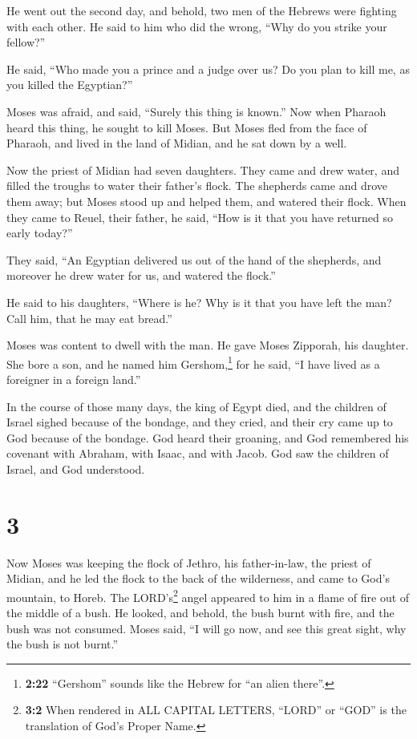  He went out the second day, and behold, two men of the
Hebrews were fighting with each other. He said to him who did the wrong,
``Why do you strike your fellow?''

 He said, ``Who made you a prince and a judge over us? Do
you plan to kill me, as you killed the Egyptian?''

Moses was afraid, and said, ``Surely this thing is known.''
 Now when Pharaoh heard this thing, he sought to kill
Moses. But Moses fled from the face of Pharaoh, and lived in the land of
Midian, and he sat down by a well.

 Now the priest of Midian had seven daughters. They came
and drew water, and filled the troughs to water their father's flock.
 The shepherds came and drove them away; but Moses stood
up and helped them, and watered their flock.  When they
came to Reuel, their father, he said, ``How is it that you have returned
so early today?''

 They said, ``An Egyptian delivered us out of the hand of
the shepherds, and moreover he drew water for us, and watered the
flock.''

 He said to his daughters, ``Where is he? Why is it that
you have left the man? Call him, that he may eat bread.''

 Moses was content to dwell with the man. He gave Moses
Zipporah, his daughter.  She bore a son, and he named him
Gershom,\footnote{\textbf{2:22} ``Gershom'' sounds like the Hebrew for
  ``an alien there''.} for he said, ``I have lived as a foreigner in a
foreign land.''

 In the course of those many days, the king of Egypt
died, and the children of Israel sighed because of the bondage, and they
cried, and their cry came up to God because of the bondage.
 God heard their groaning, and God remembered his
covenant with Abraham, with Isaac, and with Jacob.  God
saw the children of Israel, and God understood.

\hypertarget{section-2}{%
\section{3}\label{section-2}}

 Now Moses was keeping the flock of Jethro, his
father-in-law, the priest of Midian, and he led the flock to the back of
the wilderness, and came to God's mountain, to Horeb.  The
LORD's\footnote{\textbf{3:2} When rendered in ALL CAPITAL LETTERS,
  ``LORD'' or ``GOD'' is the translation of God's Proper Name.} angel
appeared to him in a flame of fire out of the middle of a bush. He
looked, and behold, the bush burnt with fire, and the bush was not
consumed.  Moses said, ``I will go now, and see this great
sight, why the bush is not burnt.''

